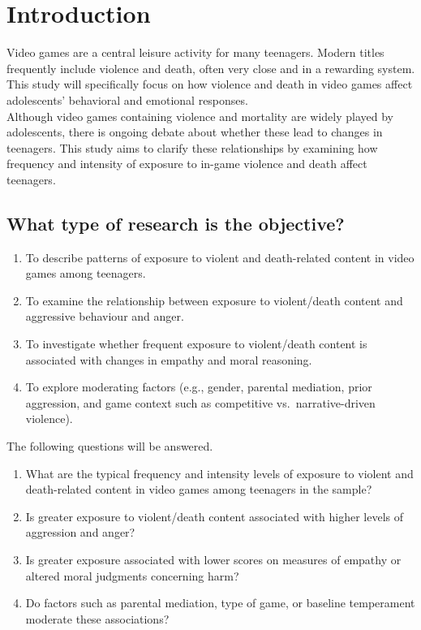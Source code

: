 \section{Introduction}
Video games are a central leisure activity for many teenagers. Modern titles frequently include
violence and death, often very close and in a rewarding system. This study will specifically focus on how violence and death in video games affect adolescents' 
behavioral and emotional responses.
\\
Although video games containing violence and mortality are widely played by adolescents, there is ongoing debate about whether these lead to changes in teenagers. 
This study aims to clarify these relationships by examining how frequency and intensity of exposure to in-game violence and death affect teenagers.


\subsection{What type of research is the objective?}

\begin{enumerate}

    \item To describe patterns of exposure to violent and death-related content in video games among teenagers.
    \item To examine the relationship between exposure to violent/death content and aggressive behaviour and anger.
    \item To investigate whether frequent exposure to violent/death content is associated with changes in empathy and moral reasoning.
    \item To explore moderating factors (e.g., gender, parental mediation, prior aggression, and game context such as competitive vs.\ narrative-driven violence).
\end{enumerate}
The following questions will be answered.
\begin{enumerate}
    \item What are the typical frequency and intensity levels of exposure to violent and death-related content in video games among teenagers in the sample?
    \item Is greater exposure to violent/death content associated with higher levels of aggression and anger?
    \item Is greater exposure associated with lower scores on measures of empathy or altered moral judgments concerning harm?
    \item Do factors such as parental mediation, type of game, or baseline temperament moderate these associations?
\end{enumerate}



